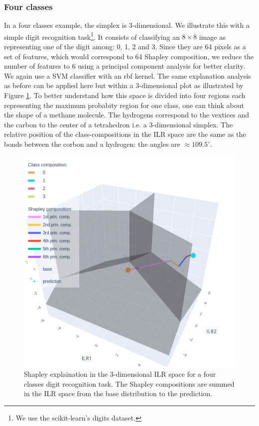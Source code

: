 \documentclass{article}
\theoremstyle{plain}
\theoremstyle{definition}
\theoremstyle{remark}
\begin{document}
\subsubsection{Four classes}

In a four classes example, the simplex is $3$-dimensional. We illustrate this with a simple digit recognition task\footnote{We use the scikit-learn's digits dataset\cite{pedregosa2011scikit}.}. It consists of classifying an $8\times8$ image as representing one of the digit among: 0, 1, 2 and 3. Since they are 64 pixels as a set of features, which would correspond to 64 Shapley composition, we reduce the number of features to 6 using a principal component analysis for better clarity. We again use a SVM classifier with an rbf kernel. The same explanation analysis as before can be applied here but within a $3$-dimensional plot as illustrated by Figure \ref{fig:4classesshapsum}. To better understand how this space is divided into four regions each representing the maximum probabity region for one class, one can think about the shape of a methane molecule. The hydrogens correspond to the vextices and the carbon to the center of a tetrahedron i.e. a $3$-dimensional simplex. The relative position of the class-compositions in the ILR space are the same as the bonds between the corbon and a hydrogen: the angles are $\approx 109.5^{\circ}$.
\begin{figure}
  \centering
  \includegraphics[width=0.9\linewidth]{figures/4classes/ilrplotsum.png}
  \caption{Shapley explaination in the $3$-dimensional ILR space for a four classes digit recognition task. The Shapley compositions are summed in the ILR space from the base distribution to the prediction.}
  \label{fig:4classesshapsum}
\end{figure}
\end{document}
